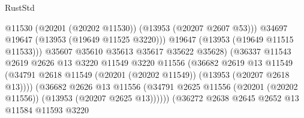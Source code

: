 \begin{lexlean}{RustStd}
\begin{coremodule}
                                                @11530
                                                (@20201 (@20202 @11530))
                                                (@13953 (@20207 @2607 @53)))
                                              @34697
                                              @19647
                                              (@13953 (@19649 @11525 @3220)))
                                            @19647
                                            (@13953 (@19649 @11515 @11533)))
                                          @35607
                                          @35610
                                          @35613
                                          @35617
                                          @35622
                                          @35628)
                                        (@36337
                                          @11543
                                          @2619
                                          @2626
                                          @13
                                          @3220
                                          @11549
                                          @3220
                                          @11556
                                          (@36682
                                            @2619
                                            @13
                                            @11549
                                            (@34791
                                              @2618
                                              @11549
                                              (@20201 (@20202 @11549))
                                              (@13953 (@20207 @2618 @13))))
                                          (@36682
                                            @2626
                                            @13
                                            @11556
                                            (@34791
                                              @2625
                                              @11556
                                              (@20201 (@20202 @11556))
                                              (@13953 (@20207 @2625 @13))))))
                                      (@36272
                                        @2638
                                        @2645
                                        @2652
                                        @13
                                        @11584
                                        @11593
                                        @3220

\end{coremodule}
\end{lexlean}
